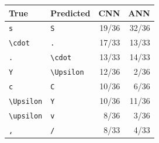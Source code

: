 \begin{tabular}{llrr}
\toprule
True & Predicted & CNN & ANN \\
\midrule
\texttt{s} & \texttt{S} & 19/36 & 32/36 \\
\texttt{\textbackslash{}cdot} & \texttt{.} & 17/33 & 13/33 \\
\texttt{.} & \texttt{\textbackslash{}cdot} & 13/33 & 14/33 \\
\texttt{Y} & \texttt{\textbackslash{}Upsilon} & 12/36 & 2/36 \\
\texttt{c} & \texttt{C} & 10/36 & 6/36 \\
\texttt{\textbackslash{}Upsilon} & \texttt{Y} & 10/36 & 11/36 \\
\texttt{\textbackslash{}upsilon} & \texttt{v} & 8/36 & 3/36 \\
\texttt{,} & \texttt{/} & 8/33 & 4/33 \\
\bottomrule
\end{tabular}
